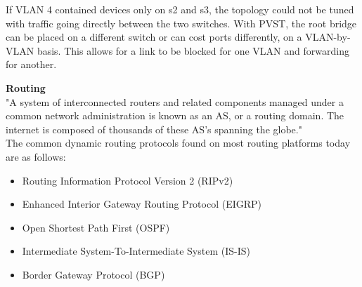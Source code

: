 \documentclass{article}
\begin{document}
If VLAN 4 contained devices only on s2 and s3, the topology could not be tuned with traffic going directly between the two switches. With PVST, the root bridge can be placed on a different switch or can cost ports differently, on a VLAN-by-VLAN basis. This allows for a link to be blocked for one VLAN and forwarding for another.

\newpage
\noindent\textbf{Routing}\\

"A system of interconnected routers and related components managed under a common network administration is known as an AS, or a routing domain. The internet is composed of thousands of these AS's spanning the globe."\\

The common dynamic routing protocols found on most routing platforms today are as follows:
\begin{itemize}
\item Routing Information Protocol Version 2 (RIPv2)
\item Enhanced Interior Gateway Routing Protocol (EIGRP)
\item Open Shortest Path First (OSPF)
\item Intermediate System-To-Intermediate System (IS-IS)
\item Border Gateway Protocol (BGP)
\end{itemize}
\end{document}
